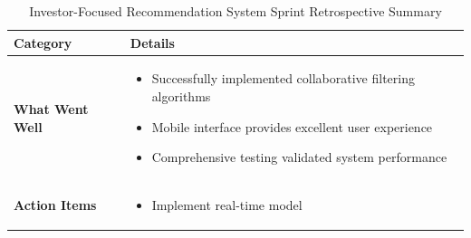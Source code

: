 \begin{table}[htbp]
    \centering
    \begin{tabular}{|p{3cm}|p{10cm}|}
        \hline
        \textbf{Category} & \textbf{Details} \\
        \hline
        \textbf{What Went Well} & 
        \begin{itemize}
            \item Successfully implemented collaborative filtering algorithms
            \item Mobile interface provides excellent user experience
            \item Comprehensive testing validated system performance
        \end{itemize} \\
        \hline
        \textbf{Action Items} & 
        \begin{itemize}
            \item Implement real-time model
        \end{itemize} \\
        \hline
    \end{tabular}
    \caption{Investor-Focused Recommendation System Sprint Retrospective Summary}
    \label{tab:recommendation-retrospective}
\end{table}





